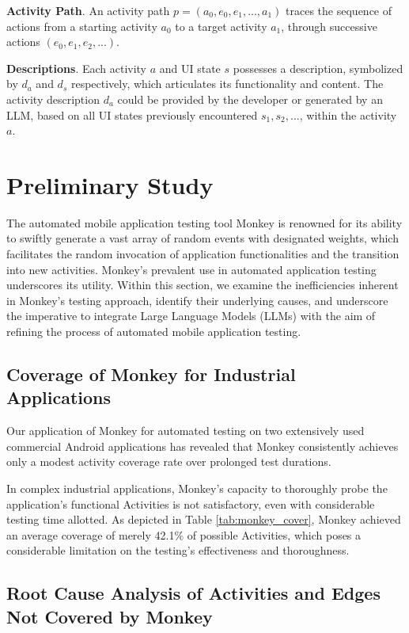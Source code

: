 \documentclass[conference]{IEEEtran}
\begin{document}
\textbf{Activity Path}. An activity path $p = (a_0, e_0, e_1, ..., a_1)$ traces the sequence of actions from a starting activity $a_0$ to a target activity $a_1$, through successive actions $(e_0, e_1, e_2, ...)$.

\textbf{Descriptions}. Each activity $a$ and UI state $s$ possesses a description, symbolized by $d_a$ and $d_s$ respectively, which articulates its functionality and content. The activity description $d_a$ could be provided by the developer or generated by an LLM, based on all UI states previously encountered $s_1, s_2, ...$, within the activity $a$.

\section{Preliminary Study} The automated mobile application testing tool Monkey is renowned for its ability to swiftly generate a vast array of random events with designated weights, which facilitates the random invocation of application functionalities and the transition into new activities. Monkey's prevalent use in automated application testing underscores its utility. Within this section, we examine the inefficiencies inherent in Monkey's testing approach, identify their underlying causes, and underscore the imperative to integrate Large Language Models (LLMs) with the aim of refining the process of automated mobile application testing.

\subsection{Coverage of Monkey for Industrial Applications}

Our application of Monkey for automated testing on two extensively used commercial Android applications has revealed that Monkey consistently achieves only a modest activity coverage rate over prolonged test durations.

In complex industrial applications, Monkey's capacity to thoroughly probe the application's functional Activities is not satisfactory, even with considerable testing time allotted. As depicted in Table \ref{tab:monkey_cover}, Monkey achieved an average coverage of merely 42.1\% of possible Activities, which poses a considerable limitation on the testing's effectiveness and thoroughness.

\subsection{Root Cause Analysis of Activities and Edges Not Covered by Monkey}
\end{document}
